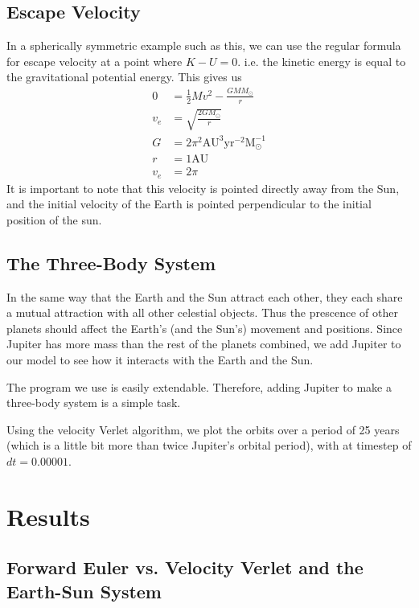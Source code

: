 \documentclass[10pt,showpacs,preprintnumbers,footinbib,amsmath,amssymb,aps,prl,twocolumn,groupedaddress,superscriptaddress,showkeys]{revtex4-1}
\begin{document}
\subsection{Escape Velocity}

In a spherically symmetric example such as this, we can use the regular formula for escape velocity at a point where $K - U = 0$. i.e. the kinetic energy is equal to the gravitational potential energy. This gives us
\begin{align*}
0 &= \frac{1}{2} Mv^2 - \frac{GMM_\odot}{r}\\
v_e &= \sqrt{\frac{2GM_\odot}{r}}\\
G &= 2\pi^2 \mathrm{AU^3yr^{-2}M_\odot^{-1}}\\
r &= 1\mathrm{AU}\\
v_e &= 2\pi
\end{align*}
It is important to note that this velocity is pointed directly away from the Sun, and the initial velocity of the Earth is pointed perpendicular to the initial position of the sun.



\subsection{The Three-Body System}

In the same way that the Earth and the Sun attract each other, they each share a mutual attraction with all other celestial objects. Thus the prescence of other planets should affect the Earth's (and the Sun's) movement and positions. Since Jupiter has more mass than the rest of the planets combined, we add Jupiter to our model to see how it interacts with the Earth and the Sun.

The program we use is easily extendable. Therefore, adding Jupiter to make a three-body system is a simple task.

Using the velocity Verlet algorithm, we plot the orbits over a period of 25 years (which is a little bit more than twice Jupiter's orbital period), with at timestep of $dt = 0.00001$.



\section{Results}



\subsection{Forward Euler vs. Velocity Verlet and the Earth-Sun System}
\end{document}
